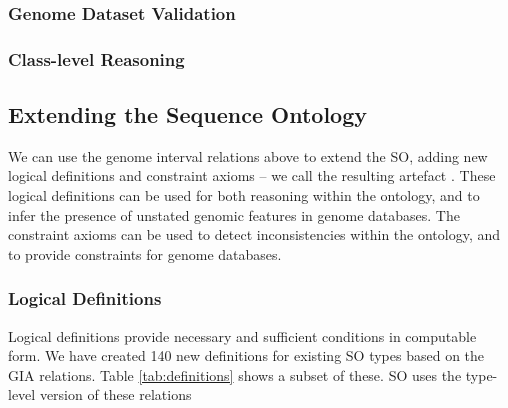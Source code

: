\documentclass{article}
\def\SOGI{\pr{SO$^{+}$}}
\begin{document}
\subsubsection{Genome Dataset Validation}

\subsubsection{Class-level Reasoning}


\subsection{Extending the Sequence Ontology}

We can use the genome interval relations above to extend the SO,
adding new logical definitions and constraint axioms -- we call the
resulting artefact \SOGI. These logical definitions can be used for
both reasoning within the ontology, and to infer the presence of
unstated genomic features in genome databases. The constraint axioms
can be used to detect inconsistencies within the ontology, and to
provide constraints for genome databases.

\subsubsection{Logical Definitions}

Logical definitions provide necessary and sufficient conditions in
computable form. We have created 140 new definitions for existing SO
types based on the GIA relations. Table \ref{tab:definitions} shows a
subset of these. SO uses the type-level version of these relations
\end{document}
